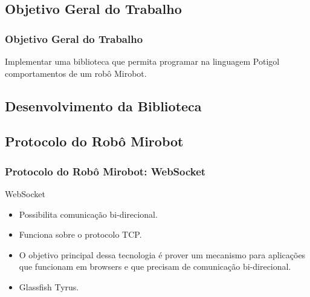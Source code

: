 \documentclass{beamer}
\begin{document}
\begin{frame}
  \section{Objetivo Geral do Trabalho}
  \frametitle{Objetivo Geral do Trabalho}
  \begin{center}
\Large    Implementar uma biblioteca que permita programar na linguagem Potigol comportamentos de um robô Mirobot.
  \end{center}
\end{frame}

\begin{frame}
  \section{Desenvolvimento da Biblioteca}
  \subsection{Protocolo do Robô Mirobot}
  \label{protocolo}
  \frametitle{Protocolo do Robô Mirobot: WebSocket}


  \begin{block}{WebSocket ~\cite{websocket2011}}
    \begin{itemize}
    \item Possibilita comunicação bi-direcional.
    \item Funciona sobre o protocolo TCP.
    \item O objetivo principal dessa tecnologia é prover um mecanismo para aplicações que funcionam em  browsers e que precisam de comunicação bi-direcional.
      \item Glassfish Tyrus.
    \end{itemize}
  \end{block}
  
\end{frame}
\end{document}
